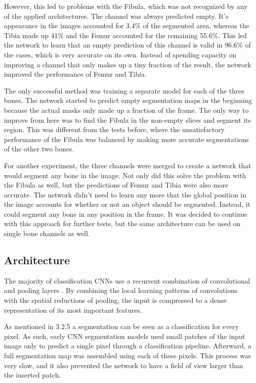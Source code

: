 However, this led to problems with the Fibula, which was not recognized by any of the applied architectures. The channel was always predicted empty. It's appearance in the images accounted for 3.4\% of the segmented area, whereas the Tibia made up 41\% and the Femur accounted for the remaining 55.6\%. This led the network to learn that an empty prediction of this channel is valid in 96.6\% of the cases, which is very accurate on its own. Instead of spending capacity on improving a channel that only makes up a tiny fraction of the result, the network improved the performance of Femur and Tibia.

The only successful method was training a separate model for each of the three bones. The network started to predict empty segmentation maps in the beginning because the actual masks only made up a fraction of the frame. The only way to improve from here was to find the Fibula in the non-empty slices and segment its region. This was different from the tests before, where the unsatisfactory performance of the Fibula was balanced by making more accurate segmentations of the other two bones.

For another experiment, the three channels were merged to create a network that would segment any bone in the image. Not only did this solve the problem with the Fibula as well, but the predictions of Femur and Tibia were also more accurate. The network didn't need to learn any more that the global position in the image accounts for whether or not an object should be segmented. Instead, it could segment any bone in any position in the frame. It was decided to continue with this approach for further tests, but the same architecture can be used on single bone channels as well.

\subsection{Architecture}

The majority of classification CNNs use a recurrent combination of convolutional and pooling layers \cite{Krizhevsky}\cite{He2015b}\cite{Iandola2016a}\cite{Ronneberger2015a}. By combining the local learning patterns of convolutions with the spatial reductions of pooling, the input is compressed to a dense representation of its most important features.

As mentioned in 3.2.5 a segmentation can be seen as a classification for every pixel. As such, early CNN segmentation models used small patches of the input image only to predict a single pixel through a classification pipeline. Afterward, a full segmentation map was assembled using each of these pixels. This process was very slow, and it also prevented the network to have a field of view larger than the inserted patch.

